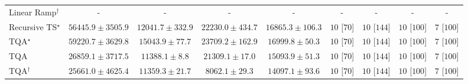 \begin{tabular}{l|cccc|cccc|}
Linear Ramp$^\dagger$ & {\cellcolor[HTML]{000000}} \color[HTML]{F1F1F1} {\cellcolor{white}} \color{black} - & {\cellcolor[HTML]{000000}} \color[HTML]{F1F1F1} {\cellcolor{white}} \color{black} - & {\cellcolor[HTML]{000000}} \color[HTML]{F1F1F1} {\cellcolor{white}} \color{black} - & {\cellcolor[HTML]{000000}} \color[HTML]{F1F1F1} {\cellcolor{white}} \color{black} - & {\cellcolor[HTML]{000000}} \color[HTML]{F1F1F1} {\cellcolor{white}} \color{black} - & {\cellcolor[HTML]{000000}} \color[HTML]{F1F1F1} {\cellcolor{white}} \color{black} - & {\cellcolor[HTML]{000000}} \color[HTML]{F1F1F1} {\cellcolor{white}} \color{black} - & {\cellcolor[HTML]{000000}} \color[HTML]{F1F1F1} {\cellcolor{white}} \color{black} - \\
Recursive TS$^\star$ & {\cellcolor[HTML]{831F86}} \color[HTML]{F1F1F1} $56445.9\pm 3505.9$ & {\cellcolor[HTML]{EBF3F8}} \color[HTML]{000000} $12041.7\pm 332.9$ & {\cellcolor[HTML]{C1D4E7}} \color[HTML]{000000} $22230.0\pm 434.7$ & {\cellcolor[HTML]{DAE7F1}} \color[HTML]{000000} $16865.3\pm 106.3$ & {\cellcolor[HTML]{49006A}} \color[HTML]{F1F1F1} $10$ [$70$] & {\cellcolor[HTML]{49006A}} \color[HTML]{F1F1F1} $10$ [$144$] & {\cellcolor[HTML]{49006A}} \color[HTML]{F1F1F1} $10$ [$100$] & {\cellcolor[HTML]{CD238F}} \color[HTML]{F1F1F1} $7$ [$100$] \\
TQA$^\star$ & {\cellcolor[HTML]{7E0E79}} \color[HTML]{F1F1F1} $59220.7\pm 3629.8$ & {\cellcolor[HTML]{E1EDF5}} \color[HTML]{000000} $15043.9\pm 77.7$ & {\cellcolor[HTML]{BACFE4}} \color[HTML]{000000} $23709.2\pm 162.9$ & {\cellcolor[HTML]{D9E6F1}} \color[HTML]{000000} $16999.8\pm 50.3$ & {\cellcolor[HTML]{49006A}} \color[HTML]{F1F1F1} $10$ [$70$] & {\cellcolor[HTML]{49006A}} \color[HTML]{F1F1F1} $10$ [$144$] & {\cellcolor[HTML]{49006A}} \color[HTML]{F1F1F1} $10$ [$100$] & {\cellcolor[HTML]{CD238F}} \color[HTML]{F1F1F1} $7$ [$100$] \\
TQA & {\cellcolor[HTML]{ABC5DF}} \color[HTML]{000000} $26859.1\pm 3717.5$ & {\cellcolor[HTML]{EDF5F9}} \color[HTML]{000000} $11388.1\pm 8.8$ & {\cellcolor[HTML]{C5D8E9}} \color[HTML]{000000} $21309.1\pm 17.0$ & {\cellcolor[HTML]{E1ECF4}} \color[HTML]{000000} $15093.9\pm 51.3$ & {\cellcolor[HTML]{49006A}} \color[HTML]{F1F1F1} $10$ [$70$] & {\cellcolor[HTML]{49006A}} \color[HTML]{F1F1F1} $10$ [$144$] & {\cellcolor[HTML]{49006A}} \color[HTML]{F1F1F1} $10$ [$100$] & {\cellcolor[HTML]{CD238F}} \color[HTML]{F1F1F1} $7$ [$100$] \\
TQA$^\dagger$ & {\cellcolor[HTML]{B1C9E1}} \color[HTML]{000000} $25661.0\pm 4625.4$ & {\cellcolor[HTML]{EDF5F9}} \color[HTML]{000000} $11359.3\pm 21.7$ & {\cellcolor[HTML]{F7FCFD}} \color[HTML]{000000} $8062.1\pm 29.3$ & {\cellcolor[HTML]{E4EFF6}} \color[HTML]{000000} $14097.1\pm 93.6$ & {\cellcolor[HTML]{49006A}} \color[HTML]{F1F1F1} $10$ [$70$] & {\cellcolor[HTML]{49006A}} \color[HTML]{F1F1F1} $10$ [$144$] & {\cellcolor[HTML]{49006A}} \color[HTML]{F1F1F1} $10$ [$100$] & {\cellcolor[HTML]{CD238F}} \color[HTML]{F1F1F1} $7$ [$100$] \\

\end{tabular}
